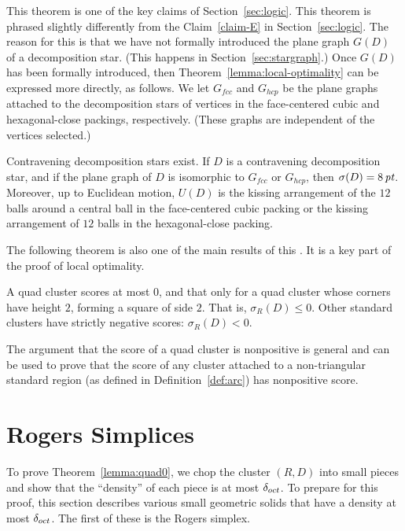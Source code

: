 \begin{remark}  This theorem is one of the key claims of
Section~\ref{sec:logic}.  This theorem is phrased slightly
differently from the Claim~\ref{claim-E} in
Section~\ref{sec:logic}. The reason for this is that we have not
formally introduced the plane graph $G(D)$ of a decomposition
star.  (This happens in Section~\ref{sec:stargraph}.)  Once $G(D)$
has been formally introduced, then
Theorem~\ref{lemma:local-optimality} can be expressed more
directly, as follows.  We let $G_{fcc}$ and $G_{hcp}$ be the plane
graphs attached to the decomposition stars of vertices in the
face-centered cubic and hexagonal-close packings, respectively.
(These graphs are independent of the vertices selected.)
\end{remark}

\begin{corollary}
 \label{lemma:local-optimality2}
Contravening decomposition stars exist. If $D$ is a contravening
decomposition star, and if the plane graph of $D$ is isomorphic to
$G_{fcc}$ or $G_{hcp}$, then $\sigma(D) = 8\,\hbox{\it pt}$.  Moreover, up
to Euclidean motion, $U(D)$ is the kissing arrangement of the $12$
balls around a central ball in the face-centered cubic packing or
the kissing arrangement of $12$ balls in the hexagonal-close
packing.
\end{corollary}

The following theorem is also one of the main results of this
\chap. It is a key part of the proof of local optimality.

\begin{theorem}\label{lemma:quad0} A quad cluster scores at most
$0$, and that only for a quad cluster whose corners have height
$2$, forming a square of side $2$. That is, $\sigma_R(D)\le 0$.
Other standard clusters have strictly negative scores:
$\sigma_R(D)<0$.
\end{theorem}

The argument that the score of a quad cluster is nonpositive is
general and can be used to prove that the score of any cluster
attached to a non-triangular standard region (as defined in
Definition~\ref{def:arc}) has nonpositive score.


\section{Rogers Simplices}

To prove Theorem~\ref{lemma:quad0}, we chop the cluster $(R,D)$
into small pieces and show that the ``density'' of each piece is
at most $\delta_{oct}$. To prepare for this proof, this section describes
various small geometric solids that have a density at most
$\delta_{oct}$.  The first of these is the Rogers simplex.

